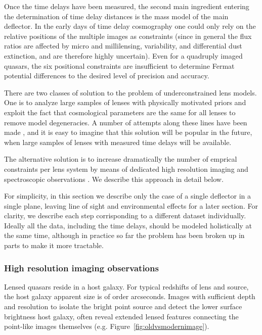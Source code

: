 Once the time delays have been measured, the second main ingredient
entering the determination of time delay distances is the mass model
of the main deflector. In the early days of time delay cosmography one
could only rely on the relative positions of the multiple images as
constraints (since in general the flux ratios are affected by micro
and millilensing, variability, and differential dust extinction, and
are therefore highly uncertain). Even for a quadruply imaged quasars,
the six positional constraints are insufficient to determine Fermat
potential differences to the desired level of precision and accuracy.

There are two classes of solution to the problem of underconstrained
lens models. One is to analyze large samples of lenses with physically
motivated priors and exploit the fact that cosmological parameters are
the same for all lenses to remove model degeneracies. A number of
attempts along these lines have been made \citep{Ogu07b,RK++2015}, and
it is easy to imagine that this solution will be popular in the
future, when large samples of lenses with measured time delays will be
available.

The alternative solution is to increase dramatically the number of
emprical constraints per lens system by means of dedicated high
resolution imaging and spectroscopic observations
\citep{Suy++10,Suy++13,Suy++14}. We describe this approach in detail
below.

For simplicity, in this section we describe only the case of a single
deflector in a single plane, leaving line of sight and environmental
effects for a later section. For clarity, we describe each step
corrisponding to a different dataset individually. Ideally all the
data, including the time delays, should be modeled holistically at the
same time, although in practice so far the problem has been broken up
in parts to make it more tractable.


\subsubsection{High resolution imaging observations}

Lensed quasars reside in a host galaxy. For typical redshifts of lens
and source, the host galaxy apparent size is of order
arcseconds. Images with sufficient depth and resolution to isolate the
bright point source and detect the lower surface brightness host
galaxy, often reveal extended lensed features connecting the
point-like images themselves (e.g. Figure~\ref{fig:oldvsmodernimage}).

